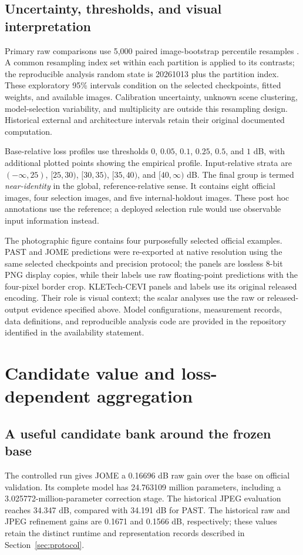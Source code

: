 \documentclass[12pt]{article}
\begin{document}
\subsection{Uncertainty, thresholds, and visual interpretation}
Primary raw comparisons use 5,000 paired image-bootstrap percentile resamples \citep{efron1979bootstrap}. A common resampling index set within each partition is applied to its contrasts; the reproducible analysis random state is 20261013 plus the partition index. These exploratory 95\% intervals condition on the selected checkpoints, fitted weights, and available images. Calibration uncertainty, unknown scene clustering, model-selection variability, and multiplicity are outside this resampling design. Historical external and architecture intervals retain their original documented computation.

Base-relative loss profiles use thresholds $0$, $0.05$, $0.1$, $0.25$, $0.5$, and $1$ dB, with additional plotted points showing the empirical profile. Input-relative strata are $(-\infty,25)$, $[25,30)$, $[30,35)$, $[35,40)$, and $[40,\infty)$ dB. The final group is termed \emph{near-identity} in the global, reference-relative sense. It contains eight official images, four selection images, and five internal-holdout images. These post hoc annotations use the reference; a deployed selection rule would use observable input information instead.

The photographic figure contains four purposefully selected official examples. PAST and JOME predictions were re-exported at native resolution using the same selected checkpoints and precision protocol; the panels are lossless 8-bit PNG display copies, while their labels use raw floating-point predictions with the four-pixel border crop. KLETech-CEVI panels and labels use its original released encoding. Their role is visual context; the scalar analyses use the raw or released-output evidence specified above. Model configurations, measurement records, data definitions, and reproducible analysis code are provided in the repository identified in the availability statement.

\section{Candidate value and loss-dependent aggregation}
\label{sec:capacity-results}
\subsection{A useful candidate bank around the frozen base}
The controlled run gives JOME a 0.16696 dB raw gain over the base on official validation. Its complete model has 24.763109 million parameters, including a 3.025772-million-parameter correction stage. The historical JPEG evaluation reaches 34.347 dB, compared with 34.191 dB for PAST. The historical raw and JPEG refinement gains are 0.1671 and 0.1566 dB, respectively; these values retain the distinct runtime and representation records described in Section~\ref{sec:protocol}.
\end{document}
